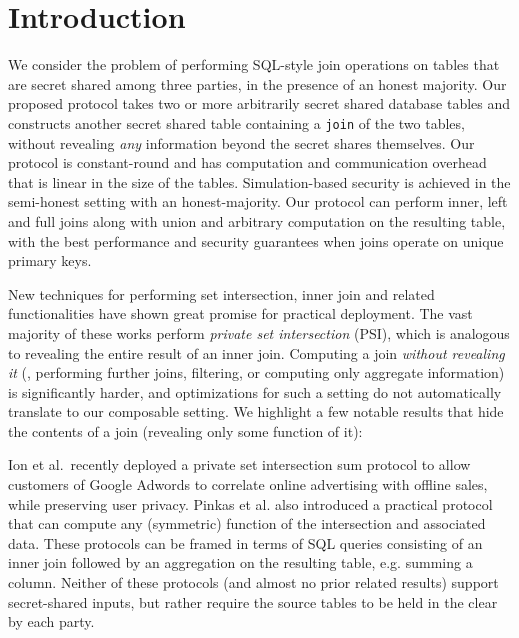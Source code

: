 \section{Introduction}

We consider the problem of performing SQL-style join operations on tables that are secret shared among three parties, in the presence of an honest majority. Our proposed protocol takes two or more arbitrarily secret shared database tables and constructs another secret shared table containing a \texttt{join} of the two tables, without revealing \emph{any} information beyond the secret shares themselves. Our protocol is constant-round and  has computation and communication overhead that is linear in the size of the tables. Simulation-based security is achieved in the semi-honest setting with an honest-majority. Our protocol can perform inner, left and full joins along with union and arbitrary computation on the resulting table, with the best performance and security guarantees when joins operate on unique primary keys.

New techniques \cite{usenix:PSZ14,USENIX:PSSZ15,PSZ16,CCS:KKRT16,PSWW18,CLR17,CHLR18,cryptoeprint:2017:738,RA17,KLSAP17,OOS17,KMPRT17} for performing set intersection, inner join and related functionalities have shown great promise for practical deployment. 
The vast majority of these works perform {\em private set intersection} (PSI), which is analogous to revealing the entire result of an inner join.
Computing a join {\em without revealing it} (\ie, performing further joins, filtering, or computing only aggregate information) is significantly harder, and optimizations for such a setting do not automatically translate to our composable setting.
We highlight a few notable results that hide the contents of a join (revealing only some function of it):

Ion et al.\ recently deployed a private set intersection sum protocol\cite{cryptoeprint:2017:738} to allow customers of Google Adwords to correlate online advertising with offline sales, while preserving user privacy. Pinkas et al. \cite{PSWW18} also introduced a practical protocol that can compute any (symmetric) function of the intersection and associated data. These protocols can be framed in terms of SQL queries consisting of an inner join followed by an aggregation on the resulting table, e.g. summing a column.  
Neither of these protocols (and almost no prior related results) support secret-shared inputs, but rather require the source tables to be held in the clear by each party.

